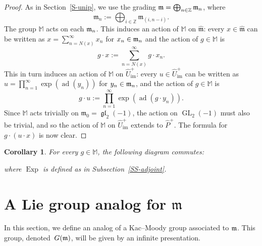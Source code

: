 \documentclass[11pt,letterpaper]{amsart}
\newcounter{thecounter}
\numberwithin{thecounter}{section}
\newtheorem{corollary}[thecounter]{Corollary}
\theoremstyle{definition}
\DeclareMathOperator{\GL}{GL}
\DeclareMathOperator{\gl}{\mathfrak{gl}}
\DeclareMathOperator{\Exp}{Exp}
\DeclareMathOperator{\ad}{ad}
\DeclareMathOperator{\im}{{im}}
\newcommand{\Z}{{\mathbb Z}}
\newcommand{\M}{{\mathbb M}}
\newcommand{\Php}{{\widehat{P}^+}}
\newcommand{\Uhimp}{{\widehat{U}_{\im}^+}}
\newcommand{\m}{{\mathfrak{m}}}
\newcommand{\mhat}{{\widehat{\mathfrak{m}}}}
\newcommand{\php}{\widehat{\mathfrak{p}}^+}
\begin{document}
\begin{proof} As in Section~\ref{S-unip}, we use the grading
${\frak{m}}=\bigoplus_{n\in\Z} \frak{m}_{n}$, where $$\mathfrak{m}_n := \bigoplus_{i\in\Z} \mathfrak{m}_{(i,n-i)}.$$
The group $\M$ acts on each $\frak{m}_{n}$. %
This induces an action of  $\mathbb{M}$  on $\mhat$:
every $x \in \mhat$ can be written as
$x =\sum_{n=N(x)}^\infty x_n$ for $x_n\in \frak{m}_{n}$ and
the action of $g\in\M$ is
  $$g\cdot x :=  \sum_{n=N(x)}^\infty g\cdot x_n. $$
This in turn induces an action of  $\mathbb{M}$  on $\Uhimp$:
every $u\in \Uhimp$ can be written as
$u =\prod_{n=1}^\infty \exp(\ad(y_n))$ for $y_n\in \frak{m}_{n}$, and
the action of $g\in\M$ is
  $$g\cdot  u :=  \prod_{n=1}^\infty \exp(\ad(g\cdot y_n)). $$
Since $\mathbb{M}$ acts trivially on $\m_0=\gl_2(-1)$, the action on $\GL_2(-1)$ must also  be trivial, and so the action of $\M$ on $\Uhimp$ extends to $\Php$.
The formula for $g\cdot(u\cdot x)$ is now clear.
\end{proof}


\begin{corollary}\label{compat} For every $g\in\mathbb{M}$, the following diagram commutes:
\begin{center}
\end{center}
where $\Exp$ is defined as in Subsection~\ref{SS-adjoint}.
\end{corollary}


\section{A Lie group analog for $\mathfrak{m}$}\label{S-Grels}
In this section, we define an analog of a  Kac--Moody group associated to $\frak m$. This group, denoted~$G(\frak m)$, will be given by an infinite presentation.
\end{document}
